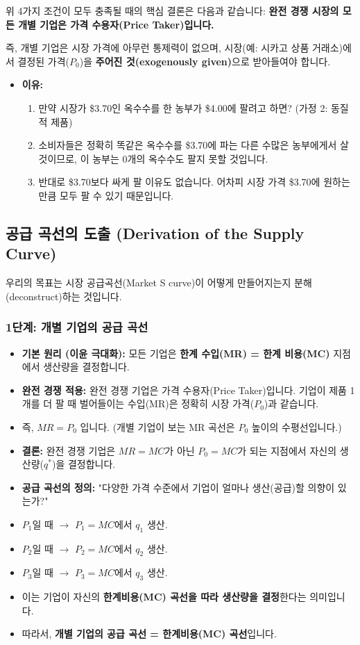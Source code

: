 \documentclass[11pt,a4paper]{article}
\theoremstyle{definition}
\begin{document}
위 4가지 조건이 모두 충족될 때의 핵심 결론은 다음과 같습니다:
\textbf{완전 경쟁 시장의 모든 개별 기업은 가격 수용자(Price Taker)입니다.}

즉, 개별 기업은 시장 가격에 아무런 통제력이 없으며, 시장(예: 시카고 상품 거래소)에서 결정된 가격($P_0$)을 \textbf{주어진 것(exogenously given)}으로 받아들여야 합니다.

\begin{itemize}
    \item \textbf{이유:}
    \begin{enumerate}
        \item 만약 시장가 \$3.70인 옥수수를 한 농부가 \$4.00에 팔려고 하면? (가정 2: 동질적 제품)
        \item 소비자들은 정확히 똑같은 옥수수를 \$3.70에 파는 다른 수많은 농부에게서 살 것이므로, 이 농부는 0개의 옥수수도 팔지 못할 것입니다.
        \item 반대로 \$3.70보다 싸게 팔 이유도 없습니다. 어차피 시장 가격 \$3.70에 원하는 만큼 모두 팔 수 있기 때문입니다.
    \end{enumerate}
\end{itemize}

\subsection{공급 곡선의 도출 (Derivation of the Supply Curve)}

우리의 목표는 시장 공급곡선(Market S curve)이 어떻게 만들어지는지 분해(deconstruct)하는 것입니다.

\subsubsection{1단계: 개별 기업의 공급 곡선}

\begin{itemize}
    \item \textbf{기본 원리 (이윤 극대화):} 모든 기업은 \textbf{한계 수입(MR) = 한계 비용(MC)} 지점에서 생산량을 결정합니다.
    \item \textbf{완전 경쟁 적용:} 완전 경쟁 기업은 가격 수용자(Price Taker)입니다. 기업이 제품 1개를 더 팔 때 벌어들이는 수입(MR)은 정확히 시장 가격($P_0$)과 같습니다.
    \item 즉, $MR = P_0$ 입니다. (개별 기업이 보는 MR 곡선은 $P_0$ 높이의 수평선입니다.)
    \item \textbf{결론:} 완전 경쟁 기업은 $MR = MC$가 아닌 \textbf{$P_0 = MC$}가 되는 지점에서 자신의 생산량($q^*$)을 결정합니다.
    \item \textbf{공급 곡선의 정의:} "다양한 가격 수준에서 기업이 얼마나 생산(공급)할 의향이 있는가?"
    \item $P_1$일 때 $\to$ $P_1 = MC$에서 $q_1$ 생산.
    \item $P_2$일 때 $\to$ $P_2 = MC$에서 $q_2$ 생산.
    \item $P_3$일 때 $\to$ $P_3 = MC$에서 $q_3$ 생산.
    \item 이는 기업이 자신의 \textbf{한계비용(MC) 곡선을 따라 생산량을 결정}한다는 의미입니다.
    \item 따라서, \textbf{개별 기업의 공급 곡선 = 한계비용(MC) 곡선}입니다.
\end{itemize}
\end{document}

